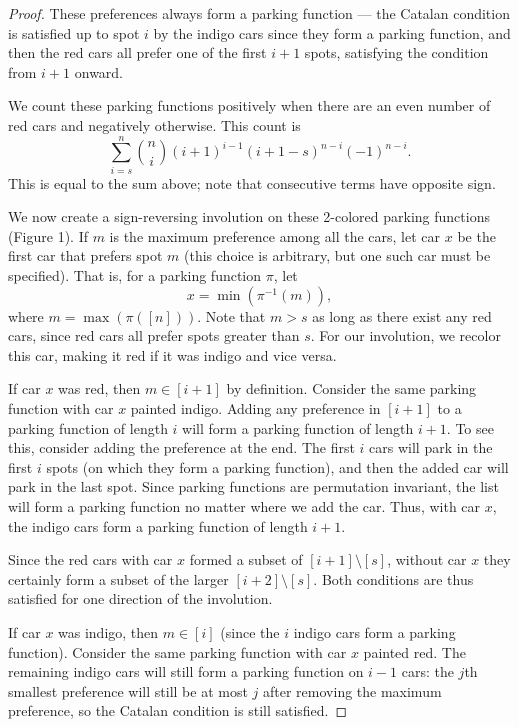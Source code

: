 \documentclass[12pt]{article}
\begin{document}
\begin{proof}
    
    These preferences always form a parking function --- the Catalan condition is satisfied up to spot $i$ by the indigo cars since they form a parking function, and then the red cars all prefer one of the first $i + 1$ spots, satisfying the condition from $i+1$ onward.
    
    We count these parking functions positively when there are an even number of red cars and negatively otherwise. This count is
	\[
		\sum_{i = s}^{n} \binom{n}{i} (i + 1)^{i - 1} (i + 1 - s)^{n - i} (-1)^{n - i}.
	\]
	This is equal to the sum above; note that consecutive terms have opposite sign.

	We now create a sign-reversing involution on these 2-colored parking functions (Figure 1). If $m$ is the maximum preference among all the cars, let car $x$ be the first car that prefers spot $m$ (this choice is arbitrary, but one such car must be specified). That is, for a parking function $\pi$, let \[x = \min(\pi^{-1}(m)),\] where $m=\max(\pi([n]))$. Note that $m > s$ as long as there exist any red cars, since red cars all prefer spots greater than $s$. For our involution, we recolor this car, making it red if it was indigo and vice versa. 

	If car $x$ was red, then  $m\in [i + 1]$ by definition. Consider the same parking function with car $x$ painted indigo. Adding any preference in $[i + 1]$ to a parking function of length $i$ will form a parking function of length $i + 1$. To see this, consider adding the preference at the end. The first $i$ cars will park in the first $i$ spots (on which they form a parking function), and then the added car will park in the last spot. Since parking functions are permutation invariant, the list will form a parking function no matter where we add the car. Thus, with car $x$, the indigo cars form a parking function of length $i + 1$.
    
    Since the red cars with car $x$ formed a subset of $[i + 1] \setminus [s]$, without car $x$ they certainly form a subset of the larger $[i + 2] \setminus [s]$. Both conditions are thus satisfied for one direction of the involution.

	If car $x$ was indigo, then $m \in [i]$ (since the $i$ indigo cars form a parking function). Consider the same parking function with car $x$ painted red. The remaining indigo cars will still form a parking function on $i - 1$ cars: the $j$th smallest preference will still be at most $j$ after removing the maximum preference, so the Catalan condition is still satisfied.
    

\end{proof}
\end{document}
